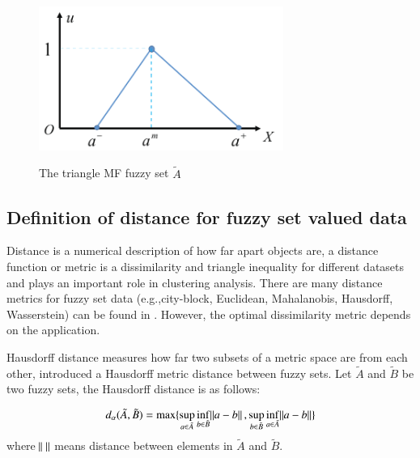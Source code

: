 \documentclass[preprint,12pt,authoryear]{elsarticle}
\begin{document}
\begin{figure}
  \centering
  \includegraphics[width=8cm]{figures/Fig1}\\
  \caption{The triangle MF fuzzy set $\tilde{A}$}\label{fig:1}
\end{figure}


\subsection{Definition of distance for fuzzy set valued data}

Distance is a numerical description of how far apart objects are, a distance function or metric  is a dissimilarity and triangle inequality for different datasets and plays an important role in clustering analysis. There are many distance metrics for fuzzy set data (e.g.,city-block, Euclidean, Mahalanobis, Hausdorff, Wasserstein) can be found in \citep{wang1997new, zwick1987measures, diamond1994metric, chaudhur1996metric, saha2002fuzzy, de2006adaptive, irpino2014dynamic}. However, the optimal dissimilarity metric depends on the application.

Hausdorff distance measures how far two subsets of a metric space are from each other, \cite{diamond1994metric} introduced a Hausdorff metric distance between fuzzy sets. Let $\tilde{A}$ and $\tilde{B}$ be two fuzzy sets, the Hausdorff distance is as follows:


\begin{equation}\label{eq:1}
\begin{split}
d_{\alpha}(\tilde{A}, \tilde{B}) = \max \lbrace \sup_{a \in \tilde{A}} \inf_{b \in \tilde{B}} \norm{a-b}, \sup_{b \in \tilde{B}} \inf_{a \in \tilde{A}} \norm{a-b} \rbrace
\end{split}
\end{equation}
where $\norm{\;}$ means distance between elements in  $\tilde{A}$ and $ \tilde{B}$.
\end{document}

